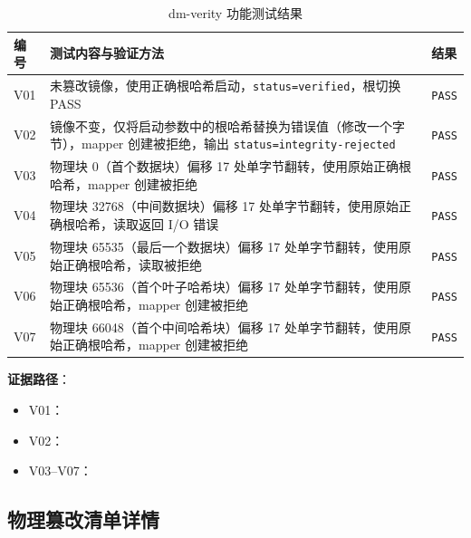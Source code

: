 \begin{table}[H]
    \centering
    \caption{dm-verity 功能测试结果}
    \begin{tabular}{p{}p{}p{}}
        \toprule
        \textbf{编号} & \textbf{测试内容与验证方法} & \textbf{结果} \\
        \midrule
        V01 & 未篡改镜像，使用正确根哈希启动，\texttt{status=verified}，根切换 PASS & \texttt{PASS} \\
        V02 & 镜像不变，仅将启动参数中的根哈希替换为错误值（修改一个字节），mapper 创建被拒绝，输出 \texttt{status=integrity-rejected} & \texttt{PASS} \\
        V03 & 物理块 0（首个数据块）偏移 17 处单字节翻转，使用原始正确根哈希，mapper 创建被拒绝 & \texttt{PASS} \\
        V04 & 物理块 32768（中间数据块）偏移 17 处单字节翻转，使用原始正确根哈希，读取返回 I/O 错误 & \texttt{PASS} \\
        V05 & 物理块 65535（最后一个数据块）偏移 17 处单字节翻转，使用原始正确根哈希，读取被拒绝 & \texttt{PASS} \\
        V06 & 物理块 65536（首个叶子哈希块）偏移 17 处单字节翻转，使用原始正确根哈希，mapper 创建被拒绝 & \texttt{PASS} \\
        V07 & 物理块 66048（首个中间哈希块）偏移 17 处单字节翻转，使用原始正确根哈希，mapper 创建被拒绝 & \texttt{PASS} \\
        \bottomrule
    \end{tabular}
\end{table}

\textbf{证据路径}：
\begin{itemize}
    \item V01：\texttt{}
    \item V02：\texttt{}
    \item V03--V07：\texttt{}
\end{itemize}

\subsection{物理篡改清单详情}

